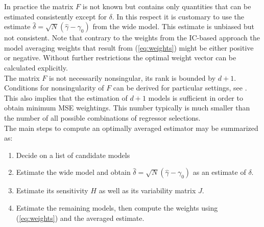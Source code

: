 \documentclass[12pt, a4paper]{article}
\numberwithin{defcounter}{section}
\numberwithin{excounter}{section}
\begin{document}
In practice the matrix $F$ is not known but contains  only quantities that can be estimated consistently except for $\delta$. In this respect it is customary to use the estimate $\hat \delta = \sqrt{N} (\hat \gamma - \gamma_0)$ from the wide model. This estimate is unbiased but not consistent. Note that contrary to the weights from the \ac{IC}-based approach the model averaging weights that result from (\ref{eq:weights}) might be either positive or negative. Without further restrictions the optimal weight vector can be calculated explicitly. 
\\
The matrix $F$ is not necessarily nonsingular, its rank is bounded by $d+1$. Conditions for nonsingularity of $F$ can be derived for particular settings, see \cite{charkhi2016}. This also implies that the estimation of $d+1$ models is sufficient in order to obtain minimum MSE weightings. This number typically is much smaller than the number of all possible combinations of regressor selections.  
\\
The main steps to compute an optimally averaged estimator may be summarized as:
\begin{enumerate}
\item{Decide on a list of candidate models}
\item{Estimate the wide model and obtain $\hat \delta = \sqrt{N}(\hat \gamma - \gamma_0)$ as an estimate of $\delta$.}
\item{Estimate its sensitivity $H$ as well as its variability matrix $J$.} %
\item{Estimate the remaining models, then compute the weights using (\ref{eq:weights}) and the averaged estimate.}
\end{enumerate}
\end{document}
